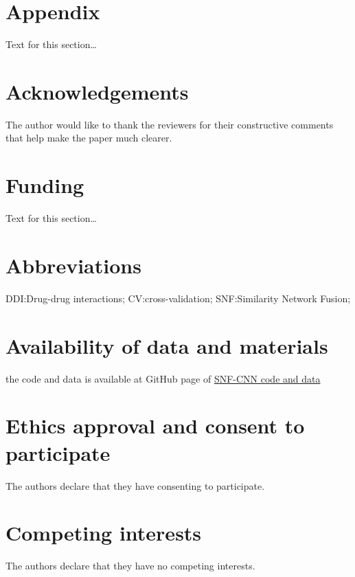 \documentclass{bmcart}
\begin{document}
\section*{Appendix}
Text for this section\ldots


\begin{backmatter}

\section*{Acknowledgements}%
The author would like to thank the reviewers for their constructive comments that help make the paper much clearer.

\section*{Funding}%
Text for this section\ldots

\section*{Abbreviations}%
DDI:Drug-drug interactions; CV:cross-validation; SNF:Similarity Network Fusion; 

\section*{Availability of data and materials}%
the code and data is available at GitHub page of \href{https://github.com/aminkhod/DDI-Project/tree/master/CNN\%20model\%20to\%20Recommend\%20Comperhancive\%20DDIs}{SNF-CNN code and data}


\section*{Ethics approval and consent to participate}%
The authors declare that they have consenting to participate.

\section*{Competing interests}
The authors declare that they have no competing interests.


\end{backmatter}
\end{document}
